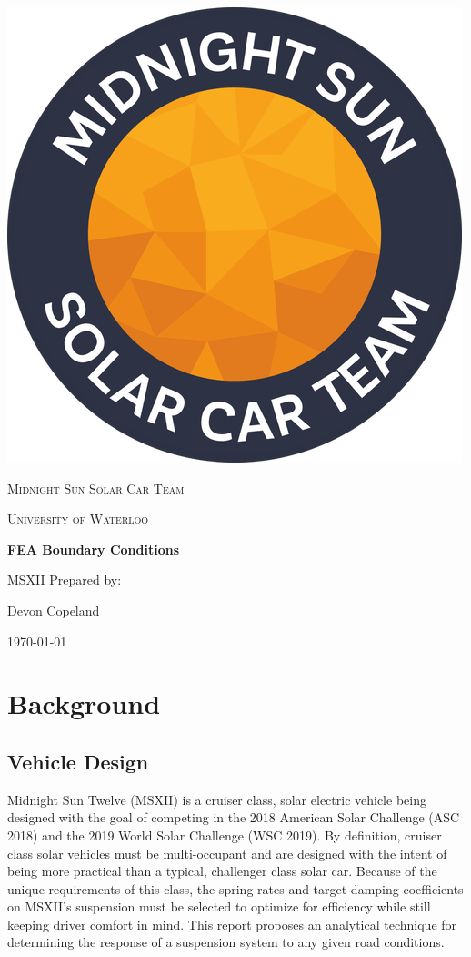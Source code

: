 \documentclass[12pt]{article}
\begin{document}
\begin{titlepage}
	\vspace*{3cm}
	\centering
	\includegraphics[width=.25\textwidth]{./LaTex/midnightSunLogoCircle.png}\par
	\vspace{1.5cm}
	{\scshape\LARGE Midnight Sun Solar Car Team \par}
	{\scshape\large University of Waterloo\par}
	\vspace{3.5cm}
	{\huge\bfseries FEA Boundary Conditions\par}
	\vspace{0.2cm}
	\large MSXII
	\vfill
	Prepared by:\par
	Devon Copeland\par
	\vspace{1cm}
	\today\par
\end{titlepage}

\section{Background}
\subsection{Vehicle Design}
Midnight Sun Twelve (MSXII) is a cruiser class, solar electric vehicle being designed with the goal of competing in the 2018 American Solar Challenge (ASC 2018) and the 2019 World Solar Challenge (WSC 2019). By definition, cruiser class solar vehicles must be multi-occupant and are designed with the intent of being more practical than a typical, challenger class solar car. Because of the unique requirements of this class, the spring rates and target damping coefficients on MSXII's suspension must be selected to optimize for efficiency while still keeping driver comfort in mind. This report proposes an analytical technique for determining the response of a suspension system to any given road conditions. 
\end{document}
